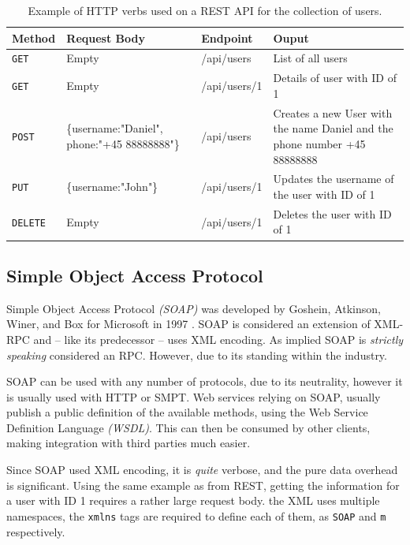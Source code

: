 			\begin{table}
				\begin{tabular}{p{} | p{} | p{} | p{}}
					Method & Request Body & Endpoint & Ouput \\
					\hline
					\verb=GET= & Empty & /api/users & List of all users \\
					\hline
					\verb=GET= & Empty & /api/users/1 & Details of user with ID of 1 \\
					\hline
					\verb=POST= & \{username:"Daniel", phone:"+45 88888888"\} & /api/users & Creates a new User with the name Daniel and the phone number +45 88888888 \\
					\hline
					\verb=PUT= & \{username:"John"\} & /api/users/1 & Updates the username of the user with ID of 1\\
					\hline
					\verb=DELETE= & Empty & /api/users/1 & Deletes the user with ID of 1\\
				\end{tabular}

				\caption{Example of HTTP verbs used on a REST API for the collection of users.}
				\label{tbl:rest_example}

			\end{table}

		\subsection{Simple Object Access Protocol}
			Simple Object Access Protocol \emph{(SOAP)} was developed by Goshein, Atkinson, Winer, and Box for Microsoft in 1997 \cite{soap_origin}. SOAP is considered an extension of XML-RPC and -- like its predecessor -- uses XML encoding. As implied SOAP is \emph{strictly speaking} considered an RPC. However, due to its standing within the industry.

			SOAP can be used with any number of protocols, due to its neutrality, however it is usually used with HTTP or SMPT. Web services relying on SOAP, usually publish a public definition of the available methods, using the Web Service Definition Language \emph{(WSDL)}. This can then be consumed by other clients, making integration with third parties much easier.

			Since SOAP used XML encoding, it is \emph{quite} verbose, and the pure data overhead is significant. Using the same example as from REST, getting the information for a user with ID 1 requires a rather large request body. the XML uses multiple namespaces, the \verb=xmlns= tags are required to define each of them, as \verb=SOAP= and \verb=m= respectively.

